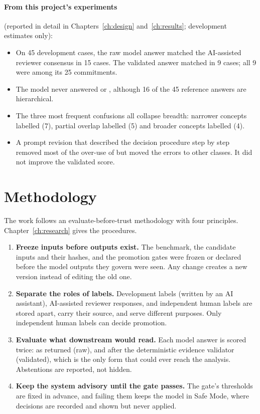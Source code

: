 \paragraph{From this project's experiments} (reported in detail in Chapters~\ref{ch:design} and~\ref{ch:results}; development estimates only):
\begin{itemize}
    \item On 45 development cases, the raw model answer matched the AI-assisted reviewer consensus in 15 cases. The validated answer matched in 9 cases; all 9 were among its 25 commitments.
    \item The model never answered \PA{} or \CH{}, although 16 of the 45 reference answers are hierarchical.
    \item The three most frequent confusions all collapse breadth: narrower concepts labelled \SC{} (7), partial overlap labelled \SC{} (5) and broader concepts labelled \RE{} (4).
    \item A prompt revision that described the decision procedure step by step removed most of the over-use of \SC{} but moved the errors to other classes. It did not improve the validated score.
\end{itemize}

\section{Methodology}
\label{sec:methodology}

The work follows an evaluate-before-trust methodology with four principles. Chapter~\ref{ch:research} gives the procedures.

\begin{enumerate}
    \item \textbf{Freeze inputs before outputs exist.} The benchmark, the candidate inputs and their hashes, and the promotion gates were frozen or declared before the model outputs they govern were seen. Any change creates a new version instead of editing the old one.
    \item \textbf{Separate the roles of labels.} Development labels (written by an AI assistant), AI-assisted reviewer responses, and independent human labels are stored apart, carry their source, and serve different purposes. Only independent human labels can decide promotion.
    \item \textbf{Evaluate what downstream would read.} Each model answer is scored twice: as returned (raw), and after the deterministic evidence validator (validated), which is the only form that could ever reach the analysis. Abstentions are reported, not hidden.
    \item \textbf{Keep the system advisory until the gate passes.} The gate's thresholds are fixed in advance, and failing them keeps the model in Safe Mode, where decisions are recorded and shown but never applied.
\end{enumerate}
